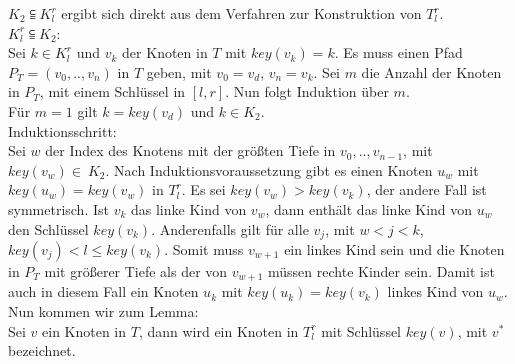 \documentclass[a4paper,12pt]{article}
\begin{document}
\noindent $K_2 \subseteqq  K^r_l$ ergibt sich direkt aus dem Verfahren zur Konstruktion von $T^r_l$.\\

\noindent $ K^r_l \subseteqq K_2$:\\
Sei $k \in K^r_l$ und $v_k$ der Knoten in $T$ mit $\mathit{key}(v_k) = k$. Es muss einen Pfad $P_T = \left(v_0,..,v_n\right)$ in $T$ geben, mit $v_0 = v_d$, $v_n = v_k$. Sei $m$ die Anzahl der Knoten in $P_T$, mit einem Schlüssel in  $\left[l,r\right]$. Nun folgt Induktion über $m$.\\
Für $m = 1$ gilt $k = \mathit{key}\left(v_d\right)$  und $k \in K_2$. \\
Induktionsschritt:\\
Sei $w$ der Index des Knotens mit der größten Tiefe in $ v_0,..,v_{n-1}$, mit $\mathit{key}(v_w) \in~K_2$. Nach Induktionsvoraussetzung gibt es einen Knoten $u_w$ mit $\mathit{key}(u_w) = \mathit{key}(v_w)$ in $T^r_l$.  Es sei $\mathit{key}(v_w) > \mathit{key}(v_k)$, der andere Fall ist symmetrisch. Ist $v_k$ das linke Kind von $v_w$, dann enthält das linke Kind von $u_w$ den Schlüssel $\mathit{key}(v_k)$. Anderenfalls gilt für alle $v_j$, mit $w < j < k$, $\mathit{key}(v_j) < l \leq \mathit{key}(v_k)$. Somit muss $v_{w+1}$ ein linkes Kind sein und die Knoten in $P_T$ mit größerer Tiefe als der von $v_{w+1}$ müssen rechte Kinder sein. Damit ist auch in diesem Fall ein Knoten $u_k$ mit $\mathit{key}(u_k) = \mathit{key}(v_k)$ linkes Kind von $u_w$.  \\

\noindent Nun kommen wir zum Lemma:\\






\noindent Sei $v$ ein Knoten in $T$, dann wird ein Knoten in $T^r_l$ mit Schlüssel $\mathit{key}(v)$,  mit $v^*$ bezeichnet.  
\end{document}
